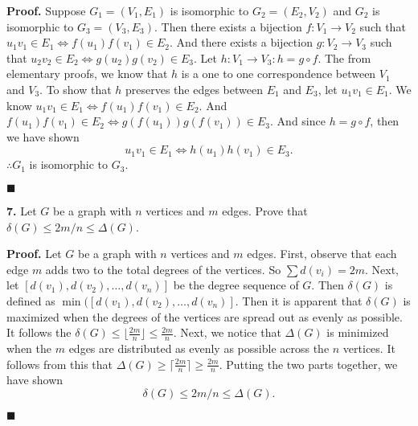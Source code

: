 \documentclass{article}
\begin{document}
\vspace{3mm}  

\textbf{Proof.} Suppose \(G_1=(V_1,E_1)\) is isomorphic to \(G_2=(E_2,V_2)\) and \(G_2\) is isomorphic to \(G_3=(V_3,E_3)\). Then there exists a bijection \(f:V_1\rightarrow V_2\) such that \(u_1 v_1 \in E_1 \iff f(u_1)f(v_1) \in E_2\). And there exists a bijection \(g:V_2 \rightarrow V_3\) such that \( u_2 v_2 \in E_2 \iff g(u_2)g(v_2) \in E_3\). Let \(h:V_1 \rightarrow V_3 : h = g \circ f \).  The from elementary proofs, we know that \(h\) is a one to one correspondence between \(V_1\) and \(V_3\). To show that \(h\) preserves the edges between \(E_1\) and \(E_3\), let \(u_1 v_1 \in E_1\). We know \(u_1 v_1 \in E_1 \iff f(u_1)f(v_1) \in E_2\). And \( f(u_1)f(v_1) \in E_2 \iff g(f(u_1))g(f(v_1)) \in E_3 \). And since \(h=g\circ f\), then we have shown 
\[
u_1v_1 \in E_1 \iff h(u_1)h(v_1) \in E_3.
\]
\(\therefore G_1\) is isomorphic to \(G_3\).
\begin{flushright}
\( \blacksquare \) 
\end{flushright}



\vspace{3mm}  

\textbf{7.} Let \(G\) be a graph with \(n\) vertices and \(m\) edges. Prove that \(\delta(G) \leq 2m/n\leq \Delta(G) \). 

\vspace{3mm}

\textbf{Proof.} Let \(G\) be a graph with \(n\) vertices and \(m\) edges. First, observe that each edge \(m\) adds two to the total degrees of the vertices. So \(\sum d(v_i) = 2m\). Next, let \( [ d(v_1), d(v_2), \ldots, d(v_n)]\) be the degree sequence of \(G\). Then \(\delta(G)\) is defined as \( \min([ d(v_1), d(v_2), \ldots, d(v_n)]\). Then it is apparent that \(\delta(G)\) is maximized when the degrees of the vertices are spread out as evenly as possible. It follows the \(\delta(G) \leq \lfloor  \frac{2m}n\rfloor  \leq \frac{2m}n\). Next, we notice that \(\Delta(G) \) is minimized when the \(m\) edges are distributed as evenly as possible across the \(n\) vertices. It follows from this that \(\Delta(G)\geq \lceil \frac{2m}n \rceil \geq \frac{2m}n  \). Putting the two parts together, we have shown
\[\delta(G) \leq 2m/n\leq \Delta(G). \] 
\begin{flushright}
\( \blacksquare \) 
\end{flushright}

\vspace{3mm}  
\end{document}
